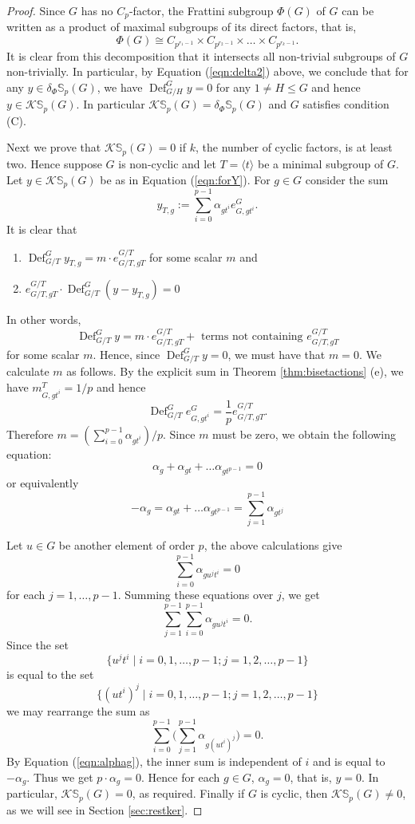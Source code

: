 \documentclass[12pt]{article}
\theoremstyle{plain}
\theoremstyle{definition}
\newcommand{\kerlin}{\mathbb S_p}
\newcommand{\defl}{\operatorname{Def}}
\begin{document}
\begin{proof}
 Since $G$ has no $C_p$-factor, the Frattini subgroup $\Phi(G)$ of $G$ can be written as a product of maximal subgroups of its direct factors, that is,
$$\Phi(G) \cong C_{p^{r_1-1}}\times C_{p^{r_2-1}}\times \ldots\times C_{p^{r_k-1}}.$$
It is clear from this decomposition that
it intersects all non-trivial subgroups of $G$ non-trivially. In particular, by Equation (\ref{eqn:delta2}) above, we conclude that for any $y\in\delta_\Phi\kerlin(G)$, we have $\defl_{G/H}^G y = 0$ for any $1\not = H\le G$ and hence $y\in \mathcal K\kerlin(G)$. In particular $\mathcal{K}\kerlin(G) = \delta_\Phi\kerlin(G)$ and $G$ satisfies condition (C). 

Next we prove that $\mathcal K\kerlin(G) = 0$ if $k$, the number of cyclic factors, is at least two. Hence suppose $G$ is non-cyclic and let $T=\langle t \rangle$ be a minimal subgroup of $G$. Let $y\in\mathcal K\kerlin(G)$ be as in Equation (\ref{eqn:forY}). For $g\in G$ consider the sum
\[
y_{T, g}:= \sum_{i=0}^{p-1} \alpha_{gt^i}e_{G, gt^i}^G. 
\] It is clear that 
\begin{enumerate}
    \item[(a)] $\defl_{G/T}^G y_{T, g} = m\cdot e_{G/T, gT}^{G/T}$ for some scalar $m$ and
    \item[(b)] $e_{G/T, gT}^{G/T}\cdot \defl_{G/T}^G (y -y_{T, g}) = 0$
\end{enumerate}
In other words, 
\[
\defl^G_{G/T} y = m\cdot e_{G/T, gT}^{G/T}  + \text{ terms not containing } e_{G/T, gT}^{G/T}
\]
for some scalar $m$. Hence, since $\defl_{G/T}^G y =0$, we must have that $m=0$. We calculate $m$ as follows. By the explicit sum in Theorem \ref{thm:bisetactions} (e), we have $m_{G, gt^i}^T = 1/p$ and hence \[ \defl_{G/T}^G e_{G, gt^i}^G = \frac{1}{p}e_{G/T, gT}^{G/T}. \]
Therefore $m = (\sum_{i=0}^{p-1}\alpha_{gt^i})/p$. Since $m$ must be zero, we obtain the following equation:
\[
\alpha_g + \alpha_{gt} + \ldots \alpha_{gt^{p-1}} =0
\]
or equivalently 
\begin{equation}\label{eqn:alphag}
    -\alpha_g = \alpha_{gt} + \ldots \alpha_{gt^{p-1}} = \sum_{j=1}^{p-1}\alpha_{gt^j}
\end{equation}

Let $u\in G$ be another element of order $p$, the above calculations give
\[
\sum_{i=0}^{p-1} \alpha_{gu^jt^i} = 0
\]
for each $j=1, \ldots, p-1$. Summing these equations over $j$, we get
\[
\sum_{j=1}^{p-1}\sum_{i=0}^{p-1} \alpha_{gu^jt^i} = 0.
\]
Since the set
\[
\{ u^jt^i\mid i=0, 1, \ldots, p-1; j=1, 2,\ldots, p-1 \}\]
is equal to the set 
\[\{ (ut^i)^j \mid i=0, 1, \ldots, p-1; j=1, 2,\ldots, p-1 \} 
\]
we may rearrange the sum as
\[
\sum_{i=0}^{p-1}\Big( \sum_{j=1}^{p-1} \alpha_{g(ut^i)^j}\Big) = 0.
\]
By Equation (\ref{eqn:alphag}), the inner sum is independent of $i$ and is equal to $-\alpha_g$. Thus we get $p\cdot \alpha_g = 0$.
Hence  for each $g\in G$, $\alpha_g =0$, that is, $y = 0$. In particular, $\mathcal{K}\kerlin(G) = 0$, as required. Finally if $G$ is cyclic, then $\mathcal K\kerlin(G)\neq 0$, as we will see in Section \ref{sec:restker}.
\end{proof}
\end{document}
